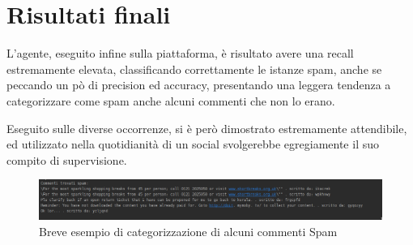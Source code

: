 \documentclass{report}
\begin{document}
    \newpage
    \section{Risultati finali}
    L'agente, eseguito infine sulla piattaforma, è risultato avere una recall estremamente elevata, classificando
    correttamente le istanze spam, anche se peccando un pò di precision ed accuracy, presentando una leggera tendenza a 
    categorizzare come spam anche alcuni commenti che non lo erano.

    Eseguito sulle diverse occorrenze, si è però dimostrato estremamente attendibile, ed utilizzato nella quotidianità
    di un social svolgerebbe egregiamente il suo compito di supervisione.

    \begin{figure}[h!]
        \centering
        \includegraphics[width =\textwidth]{immagini/commentiSpam.png}
        \caption{Breve esempio di categorizzazione di alcuni commenti Spam}

\end{figure}
\end{document}
